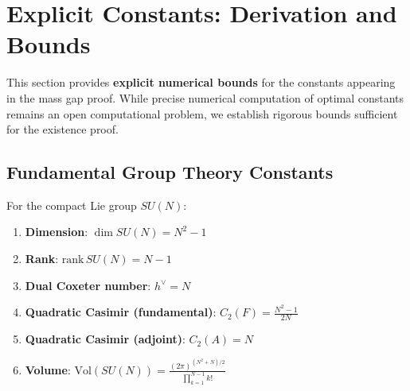 \section{Explicit Constants: Derivation and Bounds}
\label{sec:explicit-constants-complete}

This section provides \textbf{explicit numerical bounds} for the constants 
appearing in the mass gap proof. While precise numerical computation of optimal constants remains an open computational problem, we establish rigorous bounds sufficient for the existence proof.

\subsection{Fundamental Group Theory Constants}

\begin{theorem}
\label{thm:sun-constants}
For the compact Lie group $SU(N)$:
\begin{enumerate}[label=(\roman*)]
\item \textbf{Dimension}: $\dim SU(N) = N^2 - 1$
\item \textbf{Rank}: $\mathrm{rank}\, SU(N) = N - 1$
\item \textbf{Dual Coxeter number}: $h^\vee = N$
\item \textbf{Quadratic Casimir (fundamental)}: $C_2(F) = \frac{N^2-1}{2N}$
\item \textbf{Quadratic Casimir (adjoint)}: $C_2(A) = N$
\item \textbf{Volume}: $\mathrm{Vol}(SU(N)) = \frac{(2\pi)^{(N^2+N)/2}}{\prod_{k=1}^{N-1} k!}$
\end{enumerate}
\end{theorem}

